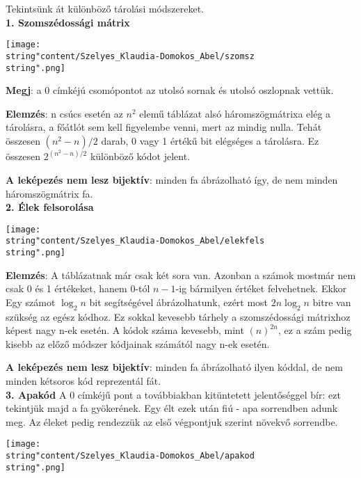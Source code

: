 \begin{solution}
Tekintsünk át különböző tárolási módszereket.\\

\textbf{1. Szomszédossági mátrix} 
\begin{center}
	\texttt{[image: \\string"content/Szelyes\_Klaudia-Domokos\_Abel/szomsz\\string".png]} 
	\par\end{center}

\textbf{Megj}: a 0 címkéjú csomópontot az utolsó sornak és utolsó
oszlopnak vettük.

\textbf{Elemzés}: n csúcs esetén az $n^{2}$ elemű táblázat alsó háromszögmátrixa
elég a tárolásra, a főátlót sem kell figyelembe venni, mert az mindig
nulla. Tehát összesen $(n^{2}-n)/2$ darab, 0 vagy 1 értékű bit elégséges
a tárolásra. Ez összesen $2^{(n^{2}-n)/2}$ különböző kódot jelent.

\textbf{A leképezés nem lesz bijektív}: minden fa ábrázolható így,
de nem minden háromszögmátrix fa.\\

\textbf{2. Élek felsorolása} 
\begin{center}
	\texttt{[image: \\string"content/Szelyes\_Klaudia-Domokos\_Abel/elekfels\\string".png]} 
	\par\end{center}

\textbf{Elemzés}: A táblázatnak már csak két sora van. Azonban a számok
mostmár nem csak 0 és 1 értékeket, hanem 0-tól $n-1$-ig bármilyen
értéket felvehetnek. Ekkor Egy számot $\log_{2}n$ bit segítségével
ábrázolhatunk, ezért most $2n\log_{2}n$ bitre van szükség az egész
kódhoz. Ez sokkal kevesebb tárhely a szomszédossági mátrixhoz képest
nagy n-ek esetén. A kódok száma kevesebb, mint $(n)^{2n}$, ez a szám
pedig kisebb az előző módszer kódjainak számától nagy n-ek esetén.

\textbf{A leképezés nem lesz bijektív}: minden fa ábrázolható ilyen
kóddal, de nem minden kétsoros kód reprezentál fát.\\

\textbf{3. Apakód} A 0 címkéjű pont a továbbiakban kitüntetett jelentőséggel
bír: ezt tekintjük majd a fa gyökerének. Egy élt ezek után fiú - apa
sorrendben adunk meg. Az éleket pedig rendezzük az első végpontjuk
szerint növekvő sorrendbe.
\begin{center}
	\texttt{[image: \\string"content/Szelyes\_Klaudia-Domokos\_Abel/apakod\\string".png]} 
	\par\end{center}


\end{solution}
